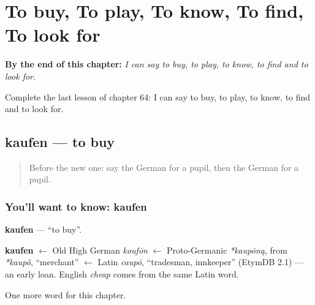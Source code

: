 
\chapter{To buy, To play, To know, To find, To look for}
\label{ch:ge-to-buy-to-play-to-know-to-find-to-look-for}

\begin{chapteropening}
\textbf{By the end of this chapter:} \emph{I can say to buy, to play, to know, to find and to look for.}

Complete the last lesson of chapter 64: I can say to buy, to play, to know, to find and to look for.
\end{chapteropening}

\section[kaufen]{kaufen — to buy}

\label{lesson:GE-C64-kaufen}



\begin{quote}
Before the new one: say the German for a pupil, then the German for a pupil.
\end{quote}

\subsection*{You'll want to know: kaufen}
\textbf{kaufen} — \textquotedblleft{}to buy\textquotedblright{}.

\begin{cousinweb}
\textbf{kaufen} $\leftarrow$ Old High German \emph{koufōn} $\leftarrow$ Proto-Germanic \emph{*kaupōną}, from \emph{*kaupô}, \textquotedblleft{}merchant\textquotedblright{} $\leftarrow$ Latin \emph{caupō}, \textquotedblleft{}tradesman, innkeeper\textquotedblright{} (EtymDB 2.1) — an early loan. English \emph{cheap} comes from the same Latin word.
\end{cousinweb}

\begin{grammarlens}[title={What you've built}]
One more word for this chapter.
\end{grammarlens}

